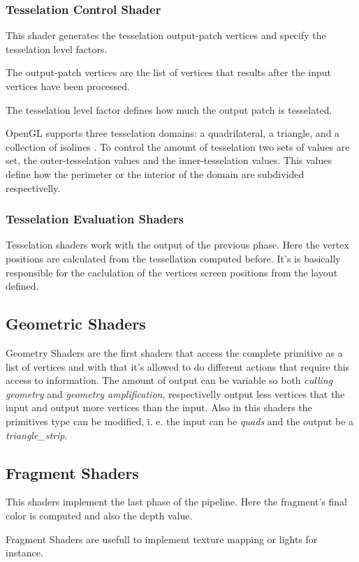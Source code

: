 \subsubsection{Tesselation Control Shader} %
\label{ssub:tesselation_control_shader}
	This shader generates the tesselation output-patch vertices and specify the tesselation level factors. 

	The output-patch vertices are the list of vertices that results after the input vertices have been processed. 

	The tesselation level factor defines how much the output patch is tesselated. 

	OpenGL supports three tesselation domains: a quadrilateral, a triangle, and a collection of isolines \cite{shreiner2013opengl}. To control the amount of tesselation two sets of values are set, the outer-tesselation values and the inner-tesselation values. This values define how the perimeter or the interior of the domain are subdivided respectivelly.


\subsubsection{Tesselation Evaluation Shaders} %
\label{ssub:tesselation_evaluation_shaders}
Tesselation shaders work with the output of the previous phase. Here the vertex positions are calculated from the tessellation computed before. It's is basically responsible for the caclulation of the vertices screen positions from the layout defined.



\subsection{Geometric Shaders} %
\label{sub:geometric_shaders}

Geometry Shaders are the first shaders that access the complete primitive as a list of vertices and with that it's allowed to do different actions that require this access to information. The amount of output can be variable so both \emph{culling geometry} and \emph{geometry amplification}, respectivelly output less vertices that the input and output more vertices than the input. Also in this shaders the primitives type can be modified, i. e. the input can be \emph{quads} and the output be a \emph{triangle\_strip}.


\subsection{Fragment Shaders} %
\label{sub:fragment_shaders}
This shaders implement the last phase of the pipeline. Here the fragment's final color is computed and also the depth value.

Fragment Shaders are usefull to implement texture mapping or lights for instance.

